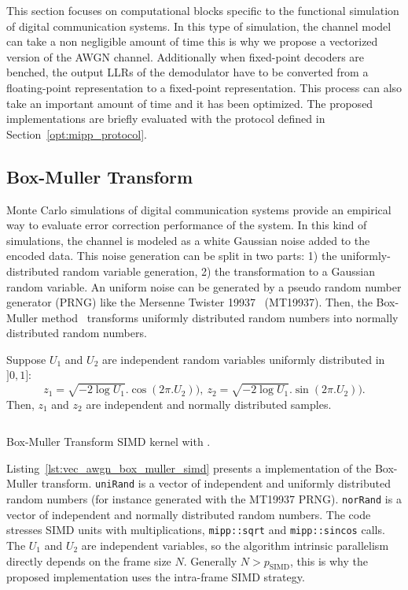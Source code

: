 This section focuses on computational blocks specific to the functional
simulation of digital communication systems. In this type of simulation,
the channel model can take a non negligible amount of time this is why we
propose a vectorized version of the AWGN channel. Additionally when fixed-point
decoders are benched, the output LLRs of the demodulator have to be converted
from a floating-point representation to a fixed-point representation. This
process can also take an important amount of time and it has been optimized.
The proposed implementations are briefly evaluated with the protocol defined in
Section~\ref{opt:mipp_protocol}.

\subsection{Box-Muller Transform}
\label{sec:vec_awgn}

Monte Carlo simulations of digital communication systems provide an empirical
way to evaluate error correction performance of the system. In this kind of
simulations, the channel is modeled as a white Gaussian noise added to the
encoded data. This noise generation can be split in two parts: 1) the
uniformly-distributed random variable generation, 2) the transformation to a
Gaussian random variable. An uniform noise can be generated by a pseudo random
number generator (PRNG) like the Mersenne Twister 19937~\cite{Matsumoto1998}
(MT19937). Then, the Box-Muller method~\cite{Box1958} transforms uniformly
distributed random numbers into normally distributed random numbers.

Suppose $U_1$ and $U_2$ are independent random variables uniformly distributed
in $]0, 1]$:
\begin{equation*}
  z_1 = \sqrt{-2 \log{U_1}}.\cos(2\pi.U_2)),~z_2 = \sqrt{-2 \log{U_1}}.\sin(2\pi.U_2)).
\end{equation*}
Then, $z_1$ and $z_2$ are independent and normally distributed samples.

\begin{listing}[htp]
  \inputminted[frame=lines,linenos]{C++}{main/chapter3/src/awgn/box_muller_simd.cpp}
  \caption{Box-Muller Transform SIMD kernel with \MIPP.}
  \label{lst:vec_awgn_box_muller_simd}
\end{listing}

Listing~\ref{lst:vec_awgn_box_muller_simd} presents a \MIPP implementation of
the Box-Muller transform. \verb|uniRand| is a vector of independent and
uniformly distributed random numbers (for instance generated with the MT19937
PRNG). \verb|norRand| is a vector of independent and normally distributed random
numbers. The code stresses SIMD units with multiplications, \verb|mipp::sqrt|
and \verb|mipp::sincos| calls. The $U_1$ and $U_2$ are independent variables, so
the algorithm intrinsic parallelism directly depends on the frame size $N$.
Generally $N > p_\text{SIMD}$, this is why the proposed implementation uses the
intra-frame SIMD strategy.

